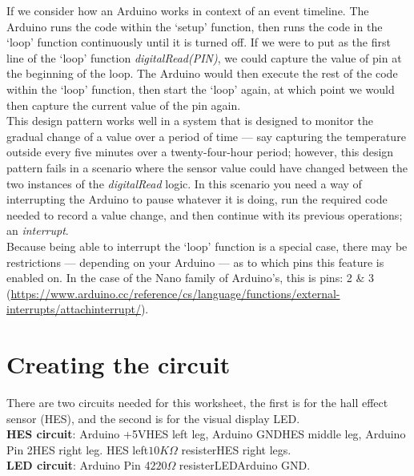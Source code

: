 \documentclass[11pt,a4paper]{article}
\begin{document}
\noindent
If we consider how an Arduino works in context of an event timeline. The Arduino runs the code within the `setup' function, then runs the code in the `loop' function continuously until it is turned off. If we were to put as the first line of the `loop' function \textit{digitalRead(PIN)}, we could capture the value of pin at the beginning of the loop. The Arduino would then execute the rest of the code within the `loop' function, then start the `loop' again, at which point we would then capture the current value of the pin again.\\

\noindent
This design pattern works well in a system that is designed to monitor the gradual change of a value over a period of time --- say capturing the temperature outside every five minutes over a twenty-four-hour period; however, this design pattern fails in a scenario where the sensor value could have changed between the two instances of the \textit{digitalRead} logic. In this scenario you need a way of interrupting the Arduino to pause whatever it is doing, run the required code needed to record a value change, and then continue with its previous operations; an \textit{interrupt}.\\

\noindent
Because being able to interrupt the `loop' function is a special case, there may be restrictions --- depending on your Arduino --- as to which pins this feature is enabled on. In the case of the Nano family of Arduino's, this is pins: 2 \& 3 (\url{https://www.arduino.cc/reference/cs/language/functions/external-interrupts/attachinterrupt/}).\\

\section{Creating the circuit}
\label{sec:circuit}
There are two circuits needed for this worksheet, the first is for the hall effect sensor (HES), and the second is for the visual display LED.\\
\noindent
\textbf{HES circuit}: Arduino +5V\textrightarrow\hspace{0.1em}HES left leg, Arduino GND\textrightarrow\hspace{0.1em}HES middle leg, Arduino Pin 2\textrightarrow\hspace{0.1em}HES right leg. HES left\textrightarrow \hspace{0.1em}$10K\Omega$ resister\textrightarrow\hspace{0.1em}HES right legs.\\
\noindent
\textbf{LED circuit}: Arduino Pin 4\textrightarrow $220\Omega$ resister\textrightarrow LED\textrightarrow Arduino GND.\\
\end{document}
